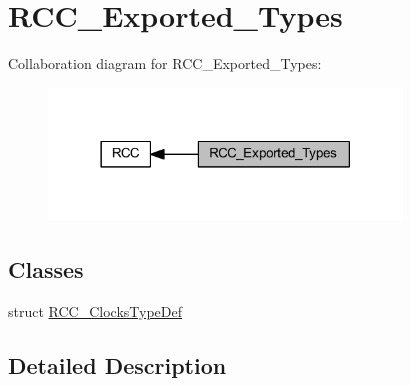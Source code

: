 \hypertarget{group___r_c_c___exported___types}{}\section{R\+C\+C\+\_\+\+Exported\+\_\+\+Types}
\label{group___r_c_c___exported___types}
Collaboration diagram for R\+C\+C\+\_\+\+Exported\+\_\+\+Types\+:
\nopagebreak
\begin{figure}[H]
\begin{center}
\leavevmode
\includegraphics[width=266pt]{group___r_c_c___exported___types}
\end{center}
\end{figure}
\subsection*{Classes}
\begin{DoxyCompactItemize}
\item 
struct \hyperlink{struct_r_c_c___clocks_type_def}{R\+C\+C\+\_\+\+Clocks\+Type\+Def}
\end{DoxyCompactItemize}


\subsection{Detailed Description}
